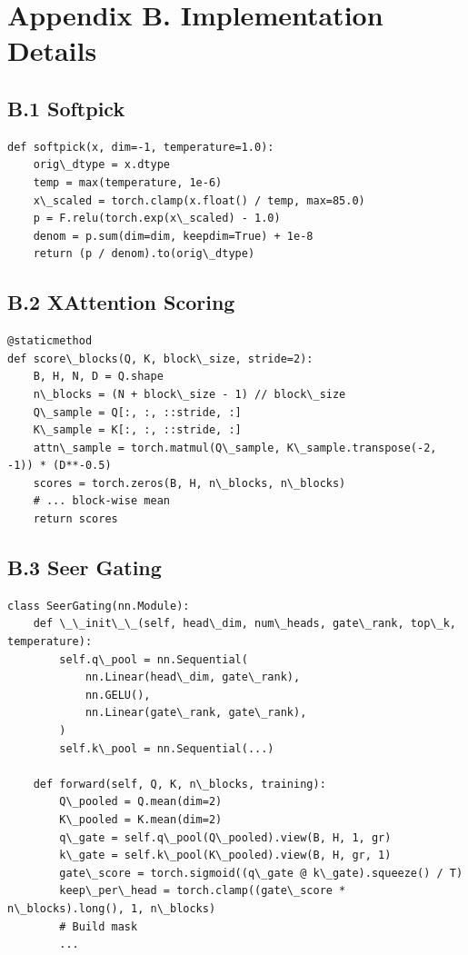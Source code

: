 \section{Appendix B. Implementation Details}

\subsection{B.1 Softpick}

\begin{lstlisting}
def softpick(x, dim=-1, temperature=1.0):
    orig\_dtype = x.dtype
    temp = max(temperature, 1e-6)
    x\_scaled = torch.clamp(x.float() / temp, max=85.0)
    p = F.relu(torch.exp(x\_scaled) - 1.0)
    denom = p.sum(dim=dim, keepdim=True) + 1e-8
    return (p / denom).to(orig\_dtype)
\end{lstlisting}

\subsection{B.2 XAttention Scoring}

\begin{lstlisting}
@staticmethod
def score\_blocks(Q, K, block\_size, stride=2):
    B, H, N, D = Q.shape
    n\_blocks = (N + block\_size - 1) // block\_size
    Q\_sample = Q[:, :, ::stride, :]
    K\_sample = K[:, :, ::stride, :]
    attn\_sample = torch.matmul(Q\_sample, K\_sample.transpose(-2, -1)) * (D**-0.5)
    scores = torch.zeros(B, H, n\_blocks, n\_blocks)
    # ... block-wise mean
    return scores
\end{lstlisting}

\subsection{B.3 Seer Gating}

\begin{lstlisting}
class SeerGating(nn.Module):
    def \_\_init\_\_(self, head\_dim, num\_heads, gate\_rank, top\_k, temperature):
        self.q\_pool = nn.Sequential(
            nn.Linear(head\_dim, gate\_rank),
            nn.GELU(),
            nn.Linear(gate\_rank, gate\_rank),
        )
        self.k\_pool = nn.Sequential(...)
    
    def forward(self, Q, K, n\_blocks, training):
        Q\_pooled = Q.mean(dim=2)
        K\_pooled = K.mean(dim=2)
        q\_gate = self.q\_pool(Q\_pooled).view(B, H, 1, gr)
        k\_gate = self.k\_pool(K\_pooled).view(B, H, gr, 1)
        gate\_score = torch.sigmoid((q\_gate @ k\_gate).squeeze() / T)
        keep\_per\_head = torch.clamp((gate\_score * n\_blocks).long(), 1, n\_blocks)
        # Build mask
        ...
\end{lstlisting}

